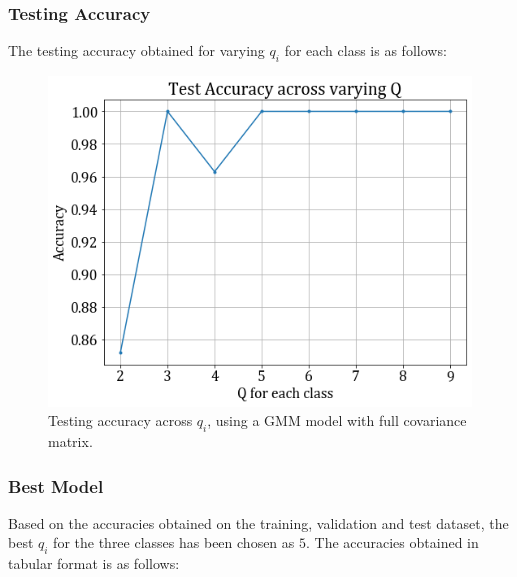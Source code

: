 \documentclass[11pt,a4paper]{article}
\begin{document}
\subsubsection{Testing Accuracy}
The testing accuracy obtained for varying $q_i$ for each class is as follows:
\begin{figure}[H]
    \centering
    \includegraphics[scale=0.45]{images/1B/1b_full_test.png}
    \caption{Testing accuracy across $q_i$, using a GMM model with full covariance matrix.}
\end{figure}

\subsubsection{Best Model}
Based on the accuracies obtained on the training, validation and test dataset, the best $q_i$ for the three classes has been chosen as $5$. The accuracies obtained in tabular format is as follows:

\end{document}

